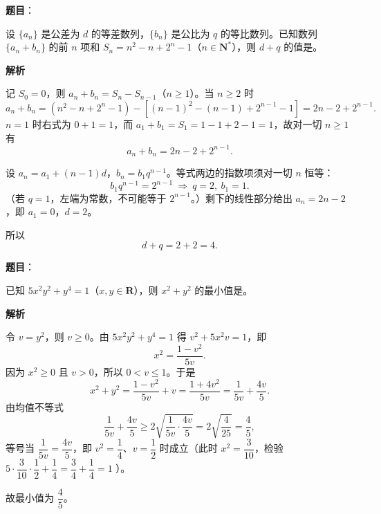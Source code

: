 \begin{answer}

\textbf{题目}：

设 $\{a_n\}$ 是公差为 $d$ 的等差数列，$\{b_n\}$ 是公比为 $q$ 的等比数列。已知数列 $\{a_n+b_n\}$ 的前 $n$ 项和 $S_n=n^2-n+2^n-1$（$n\in\mathbf N^*$），则 $d+q$ 的值是\gkblank{}。

\textbf{解析}

记 $S_0=0$，则 $a_n+b_n=S_n-S_{n-1}$（$n\geqslant1$）。当 $n\geqslant2$ 时
\nopagebreak[4]
\[a_n+b_n=\left(n^2-n+2^n-1\right)-\left[(n-1)^2-(n-1)+2^{n-1}-1\right]=2n-2+2^{n-1}.\]
$n=1$ 时右式为 $0+1=1$，而 $a_1+b_1=S_1=1-1+2-1=1$，故对一切 $n\geqslant1$ 有
\nopagebreak[4]
\[a_n+b_n=2n-2+2^{n-1}.\]

设 $a_n=a_1+(n-1)d$，$b_n=b_1q^{n-1}$。等式两边的指数项须对一切 $n$ 恒等：
\nopagebreak[4]
\[b_1q^{n-1}=2^{n-1}\ \Longrightarrow\ q=2,\ b_1=1 .\]
（若 $q=1$，左端为常数，不可能等于 $2^{n-1}$。）剩下的线性部分给出 $a_n=2n-2$，即 $a_1=0$，$d=2$。

所以
\nopagebreak[4]
\[d+q=2+2=4 .\]


\end{answer}
\begin{answer}

\textbf{题目}：

已知 $5x^2y^2+y^4=1$（$x,y\in\mathbf R$），则 $x^2+y^2$ 的最小值是\gkblank{}。

\textbf{解析}

令 $v=y^2$，则 $v\geqslant0$。由 $5x^2y^2+y^4=1$ 得 $v^2+5x^2v=1$，即
\nopagebreak[4]
\[x^2=\frac{1-v^2}{5v}.\]
因为 $x^2\geqslant0$ 且 $v>0$，所以 $0<v\leqslant1$。于是
\nopagebreak[4]
\[x^2+y^2=\frac{1-v^2}{5v}+v=\frac{1+4v^2}{5v}=\frac1{5v}+\frac{4v}{5}.\]
由均值不等式
\nopagebreak[4]
\[\frac1{5v}+\frac{4v}{5}\geqslant2\sqrt{\frac1{5v}\cdot\frac{4v}{5}}=2\sqrt{\frac4{25}}=\frac45,\]
等号当 $\dfrac1{5v}=\dfrac{4v}5$，即 $v^2=\dfrac14$、$v=\dfrac12$ 时成立（此时 $x^2=\dfrac3{10}$，检验 $5\cdot\dfrac3{10}\cdot\dfrac12+\dfrac14=\dfrac34+\dfrac14=1$ ）。

故最小值为 $\dfrac45$。

\gkanswer{答案：$\dfrac45$。令 $v=y^2\in(0,1]$，则 $x^2=\dfrac{1-v^2}{5v}$，$x^2+y^2=\dfrac1{5v}+\dfrac{4v}5\geqslant2\sqrt{\dfrac4{25}}=\dfrac45$，$v=\dfrac12$ 时取到。}

\end{answer}
